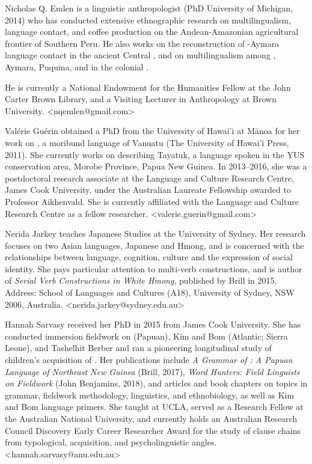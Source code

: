 \begin{refsection}
Nicholas Q. Emlen is a linguistic anthropologist (PhD University of Michigan, 2014) who has conducted extensive ethnographic research on multilingualism, language contact, and coffee production on the Andean-Amazonian agricultural frontier of Southern Peru. He also works on the reconstruction of -Aymara language contact in the ancient Central , and on multilingualism among , Aymara, Puquina, and  in the colonial . 

\pagebreak
\noindent
He is currently a National Endowment for the Humanities Fellow at the John Carter Brown Library, and a Visiting Lecturer in Anthropology at Brown University. <nqemlen@gmail.com>

Valérie Guérin obtained a PhD from the University of Hawai'i at Mānoa for her work on , a moribund language of Vanuatu (The University of Hawai'i Press, 2011).  She currently works on describing Tayatuk, a language spoken in the YUS conservation area, Morobe Province, Papua New Guinea. In 2013--2016, she was a postdoctoral research associate at the Language and Culture Research Centre, James Cook University, under the Australian Laureate Fellowship awarded to Professor Aikhenvald. She is currently affiliated with the Language and Culture Research Centre as a fellow researcher. <valerie.guerin@gmail.com>

Nerida Jarkey teaches Japanese Studies at the University of Sydney. Her research focuses on two Asian languages, Japanese and Hmong, and is concerned with the relationships between language, cognition, culture and the expression of social identity. She pays particular attention to multi-verb constructions, and is author of \textit{Serial Verb Constructions in White Hmong}, published by Brill in 2015. Address: School of Languages and Cultures (A18), University of Sydney, NSW 2006, Australia. <nerida.jarkey@sydney.edu.au> 

Hannah Sarvasy received her PhD in 2015 from James Cook University. She has conducted immersion fieldwork on  (Papuan), Kim and Bom (Atlantic; Sierra Leone), and Tashelhit Berber and ran a pioneering longitudinal study of children’s acquisition of . Her publications include \textit{A Grammar of : A Papuan Language of Northeast New Guinea} (Brill, 2017), \textit{Word Hunters: Field Linguists on Fieldwork} (John Benjamins, 2018), and articles and book chapters on topics in  grammar, fieldwork methodology,  linguistics, and ethnobiology, as well as Kim and Bom language primers. She taught at UCLA, served as a Research Fellow at the Australian National University, and currently holds an Australian Research Council Discovery Early Career Researcher Award for the study of clause chains from typological, acquisition, and psycholinguistic angles. <hannah.sarvasy@anu.edu.au>




\printbibliography[heading=subbibliography]
\end{refsection}